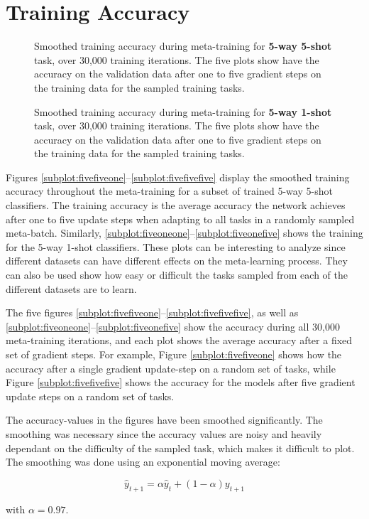 \section{Training Accuracy}

\begin{figure}[h]
    \caption{Smoothed  training accuracy during meta-training for \textbf{5-way 5-shot} task, over 30,000 training iterations. The five plots show have the accuracy on the validation data after one to five gradient steps on the training data for the sampled training tasks.}
\end{figure}

\begin{figure}[h]
    \caption{Smoothed training accuracy during meta-training for \textbf{5-way 1-shot} task, over 30,000 training iterations. The five plots show have the accuracy on the validation data after one to five gradient steps on the training data for the sampled training tasks.}
\end{figure}

Figures \ref{subplot:fivefiveone}--\ref{subplot:fivefivefive} display the smoothed training accuracy throughout the meta-training for a subset of trained 5-way 5-shot classifiers. The training accuracy is the average accuracy the network achieves after one to five update steps when adapting to all tasks in a randomly sampled meta-batch. Similarly, \ref{subplot:fiveoneone}--\ref{subplot:fiveonefive} shows the training for the 5-way 1-shot classifiers. These plots can be interesting to analyze since different datasets can have different effects on the meta-learning process. They can also be used show how easy or difficult the tasks sampled from each of the different datasets are to learn.

The five figures \ref{subplot:fivefiveone}--\ref{subplot:fivefivefive}, as well as \ref{subplot:fiveoneone}--\ref{subplot:fiveonefive} show the accuracy during all 30,000 meta-training iterations, and each plot shows the average accuracy after a fixed set of gradient steps. For example, Figure \ref{subplot:fivefiveone} shows how the accuracy after a single gradient update-step on a random set of tasks, while Figure \ref{subplot:fivefivefive} shows the accuracy for the models after five gradient update steps on a random set of tasks.

The accuracy-values in the figures have been smoothed significantly. The smoothing was necessary since the accuracy values are noisy and heavily dependant on the difficulty of the sampled task, which makes it difficult to plot. The smoothing was done using an exponential moving average:

$$\hat{y}_{t+1} = \alpha\hat{y}_t + (1-\alpha)y_{t+1}$$ 

with $\alpha=0.97$.